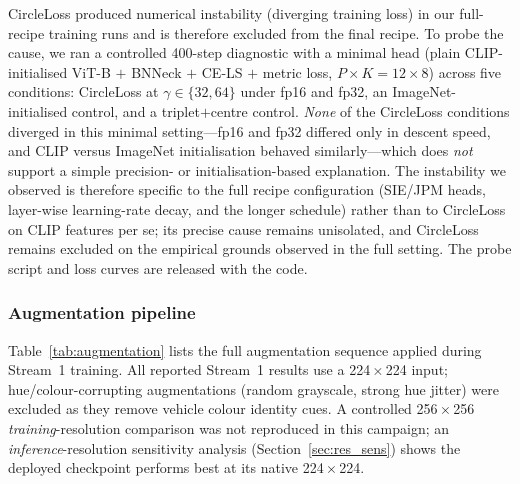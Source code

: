 \documentclass[10pt,a4paper]{article}
\begin{document}
CircleLoss produced numerical instability (diverging training loss) in our
full-recipe training runs and is therefore excluded from the final recipe. To
probe the cause, we ran a controlled 400-step diagnostic with a minimal head
(plain CLIP-initialised ViT-B $+$ BNNeck $+$ CE-LS $+$ metric loss,
$P{\times}K=12{\times}8$) across five conditions: CircleLoss at
$\gamma\in\{32,64\}$ under fp16 and fp32, an ImageNet-initialised control, and
a triplet$+$centre control. \emph{None} of the CircleLoss conditions diverged
in this minimal setting---fp16 and fp32 differed only in descent speed, and
CLIP versus ImageNet initialisation behaved similarly---which does \emph{not}
support a simple precision- or initialisation-based explanation. The
instability we observed is therefore specific to the full recipe configuration
(SIE/JPM heads, layer-wise learning-rate decay, and the longer schedule) rather
than to CircleLoss on CLIP features per se; its precise cause remains
unisolated, and CircleLoss remains excluded on the empirical grounds observed
in the full setting. The probe script and loss curves are released with the
code.

\subsubsection{Augmentation pipeline}
Table~\ref{tab:augmentation} lists the full augmentation sequence applied
during Stream~1 training. All reported Stream~1 results use a
224\,$\times$\,224 input; hue/colour-corrupting augmentations (random
grayscale, strong hue jitter) were excluded as they remove vehicle colour
identity cues. A controlled 256\,$\times$\,256 \emph{training}-resolution
comparison was not reproduced in this campaign; an \emph{inference}-resolution
sensitivity analysis (Section~\ref{sec:res_sens}) shows the deployed checkpoint
performs best at its native 224\,$\times$\,224.
\end{document}
